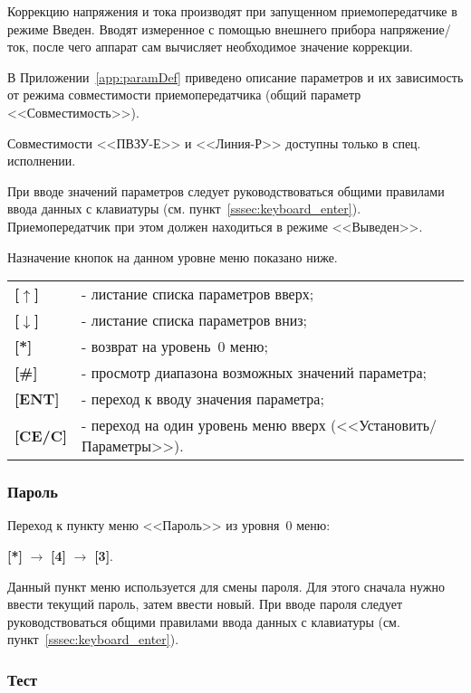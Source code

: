 Коррекцию напряжения и тока производят при запущенном приемопередатчике в режиме Введен. Вводят измеренное с помощью внешнего прибора напряжение/ток, после чего аппарат сам вычисляет необходимое значение коррекции. 

В Приложении~\ref{app:paramDef} приведено описание параметров и их зависимость от режима совместимости приемопередатчика (общий параметр <<Совместимость>>).

Совместимости <<ПВЗУ-Е>> и <<Линия-Р>> доступны только в спец. исполнении.

При вводе значений параметров следует руководствоваться общими правилами ввода данных с клавиатуры (см. пункт~\ref{sssec:keyboard_enter}). Приемопередатчик при этом должен находиться в режиме <<Выведен>>.

Назначение кнопок на данном уровне меню показано ниже.
\begin{center}
	\begin{tabular}{p{2cm} p{15cm}}
		\textbf{[$\uparrow$]}  	& - листание списка параметров вверх; \tabularnewline
		\textbf{[$\downarrow$]} & - листание списка параметров вниз; \tabularnewline
		\textbf{[*]} 			& - возврат на уровень~0 меню; \tabularnewline
		\textbf{[\#]} 			& - просмотр диапазона возможных значений параметра; \tabularnewline
		\textbf{[ENT]} 			& - переход к вводу значения параметра; \tabularnewline
		\textbf{[CE/C]} 		& - переход на один уровень меню вверх (<<Установить/Параметры>>). \tabularnewline				
	\end{tabular}
\end{center} 


\subsubsection{Пароль}	\label{sssec:password}

Переход к пункту меню <<Пароль>> из уровня~0 меню: 

\textbf{[*]} $\rightarrow$ \textbf{[4]} $\rightarrow$ \textbf{[3]}.

Данный пункт меню используется для смены пароля. Для этого сначала нужно ввести текущий пароль, затем ввести новый. При вводе пароля следует руководствоваться общими правилами ввода данных с клавиатуры (см. пункт~\ref{sssec:keyboard_enter}).


\subsubsection{Тест}	\label{sssec:test}

